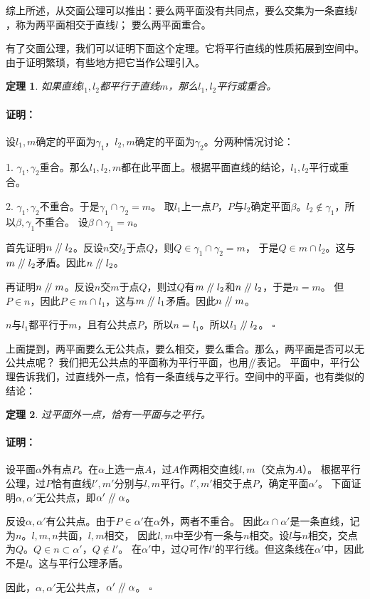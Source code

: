 \documentclass[12pt,UTF8]{ctexbook}
\newtheorem{tm}{定理}[section]
\renewcommand\parallel{\mathrel{/\mskip-4mu/}}
\newenvironment{proof2}{\paragraph{\textbf{证明：}}}{\hfill$\square$}
\begin{document}
综上所述，从交面公理可以推出：要么两平面没有共同点，要么交集为一条直线$l$，称为两平面相交于直线$l$；
要么两平面重合。

有了交面公理，我们可以证明下面这个定理。它将平行直线的性质拓展到空间中。由于证明繁琐，有些地方把它当作公理引入。
\begin{tm}
    如果直线$l_1,l_2$都平行于直线$m$，那么$l_1,l_2$平行或重合。
\end{tm}
\begin{proof2}
    设$l_1,m$确定的平面为$\gamma_1$，$l_2,m$确定的平面为$\gamma_2$。分两种情况讨论：
    
    1. $\gamma_1, \gamma_2$重合。那么$l_1,l_2,m$都在此平面上。根据平面直线的结论，$l_1,l_2$平行或重合。

    2. $\gamma_1, \gamma_2$不重合。于是$\gamma_1\cap \gamma_2 = m$。
    取$l_1$上一点$P$，$P$与$l_2$确定平面$\beta$。$l_2\notin\gamma_1$，所以$\beta,\gamma_1$不重合。
    设$\beta\cap\gamma_1 = n$。

    首先证明$n\parallel l_2$。反设$n$交$l_2$于点$Q$，则$Q\in\gamma_1\cap\gamma_2=m$，
    于是$Q\in m\cap l_2$。这与$m\parallel l_2$矛盾。因此$n\parallel l_2$。

    再证明$n\parallel m$。反设$n$交$m$于点$Q$，则过$Q$有$m\parallel l_2$和$n\parallel l_2$，于是$n=m$。
    但$P\in n$，因此$P\in m\cap l_1$，这与$m\parallel l_1$矛盾。因此$n\parallel m$。

    $n$与$l_1$都平行于$m$，且有公共点$P$，所以$n = l_1$。所以$l_1\parallel l_2$。
\end{proof2}

上面提到，两平面要么无公共点，要么相交，要么重合。那么，两平面是否可以无公共点呢？
我们把无公共点的平面称为平行平面，也用$\parallel$表记。
平面中，平行公理告诉我们，过直线外一点，恰有一条直线与之平行。空间中的平面，也有类似的结论：
\begin{tm}
    过平面外一点，恰有一平面与之平行。
\end{tm}
\begin{proof2}
    设平面$\alpha$外有点$P$。在$\alpha$上选一点$A$，过$A$作两相交直线$l,m$（交点为$A$）。
    根据平行公理，过$P$恰有直线$l', m'$分别与$l,m$平行。$l',m'$相交于点$P$，确定平面$\alpha'$。
    下面证明$\alpha,\alpha'$无公共点，即$\alpha'\parallel\alpha$。

    反设$\alpha,\alpha'$有公共点。由于$P\in\alpha'$在$\alpha$外，两者不重合。
    因此$\alpha \cap \alpha'$是一条直线，记为$n$。$l,m,n$共面，$l,m$相交，
    因此$l,m$中至少有一条与$n$相交。设$l$与$n$相交，交点为$Q$。$Q\in n\subset\alpha'$，$Q\notin l'$。
    在$\alpha'$中，过$Q$可作$l'$的平行线。但这条线在$\alpha'$中，因此不是$l$。这与平行公理矛盾。

    因此，$\alpha,\alpha'$无公共点，$\alpha'\parallel\alpha$。
\end{proof2}
\end{document}
